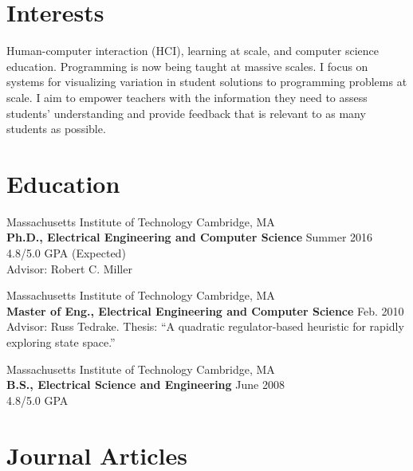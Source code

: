 \documentclass[margin]{res}
\begin{document}
 

 
\address{32 Vassar Street, Rm 32-G715\\Cambridge, MA 02139}
\address{ELG@MIT.edu\\
(215) 694-9631} 

 
\begin{resume} 
 
\section{Interests} 
Human-computer interaction (HCI), learning at scale, and computer science education. Programming is now being taught at massive scales. I focus on systems for visualizing variation in student solutions to programming problems at scale. I aim to empower teachers with the information they need to assess students' understanding and provide feedback that is relevant to as many students as possible. 


\section{Education} 
Massachusetts Institute of Technology \hfill Cambridge, MA \\
{\bf Ph.D., Electrical Engineering and Computer Science} \hfill Summer 2016\\
4.8/5.0 GPA  \hfill (Expected) \\
Advisor: Robert C. Miller 


Massachusetts Institute of Technology \hfill Cambridge, MA \\
{\bf Master of Eng., Electrical Engineering and Computer Science} \hfill Feb. 2010 \\
Advisor: Russ Tedrake. Thesis: ``A quadratic regulator-based heuristic for rapidly exploring state space.''

Massachusetts Institute of Technology \hfill Cambridge, MA \\
{\bf B.S., Electrical Science and Engineering} \hfill June 2008 \\
4.8/5.0 GPA
 
\section{Journal Articles}


\end{resume}
\end{document}
